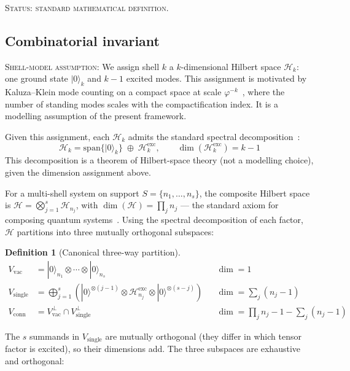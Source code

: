 \documentclass[12pt]{article}
\newtheorem{definition}[theorem]{Definition}
\newcommand{\phig}{\varphi}
\begin{document}
\textsc{Status: standard mathematical definition.}

\subsection{Combinatorial invariant}\label{sec:invariant}

\textsc{Shell-model assumption:} We assign shell $k$ a $k$-dimensional Hilbert space $\mathcal{H}_k$: one ground state $|0\rangle_k$ and $k - 1$ excited modes. This assignment is motivated by Kaluza--Klein mode counting on a compact space at scale $\phig^{-k}$~\citep{Polchinski1998}, where the number of standing modes scales with the compactification index. It is a modelling assumption of the present framework.

Given this assignment, each $\mathcal{H}_k$ admits the standard spectral decomposition~\citep{ReedSimon1978}:
\begin{equation}
    \mathcal{H}_k = \mathrm{span}\{|0\rangle_k\} \;\oplus\; \mathcal{H}_k^{\mathrm{exc}}, \qquad \dim(\mathcal{H}_k^{\mathrm{exc}}) = k - 1
\end{equation}
This decomposition is a theorem of Hilbert-space theory (not a modelling choice), given the dimension assignment above.

For a multi-shell system on support $S = \{n_1, \ldots, n_s\}$, the composite Hilbert space is $\mathcal{H} = \bigotimes_{j=1}^{s} \mathcal{H}_{n_j}$, with $\dim(\mathcal{H}) = \prod_j n_j$ --- the standard axiom for composing quantum systems~\citep{NielsenChuang2000}. Using the spectral decomposition of each factor, $\mathcal{H}$ partitions into three mutually orthogonal subspaces:

\begin{definition}[Canonical three-way partition]\label{def:partition}
\begin{align}
    V_{\mathrm{vac}} &= |0\rangle_{n_1} \otimes \cdots \otimes |0\rangle_{n_s} && \dim = 1 \\
    V_{\mathrm{single}} &= \bigoplus_{j=1}^{s} \left( |0\rangle^{\otimes (j-1)} \otimes \mathcal{H}_{n_j}^{\mathrm{exc}} \otimes |0\rangle^{\otimes (s-j)} \right) && \dim = \sum_j (n_j - 1) \\
    V_{\mathrm{conn}} &= V_{\mathrm{vac}}^{\perp} \cap V_{\mathrm{single}}^{\perp} && \dim = \prod_j n_j - 1 - \sum_j(n_j - 1)
\end{align}
\end{definition}

The $s$ summands in $V_{\mathrm{single}}$ are mutually orthogonal (they differ in which tensor factor is excited), so their dimensions add. The three subspaces are exhaustive and orthogonal:
\end{document}
